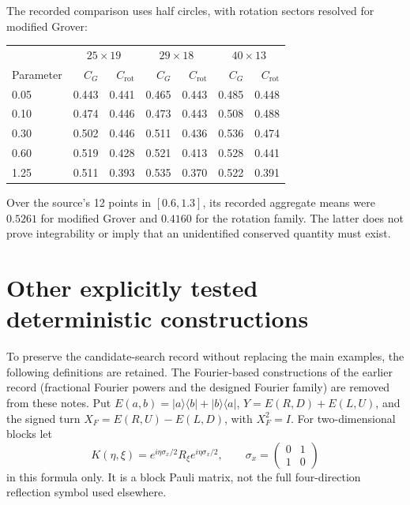 \documentclass[11pt,a4paper,oneside]{report}
\newcommand{\ket}[1]{\lvert #1\rangle}
\newcommand{\bra}[1]{\langle #1\rvert}
\newcommand{\Id}{I}
\numberwithin{equation}{chapter}
\begin{document}
The recorded comparison uses half circles, with rotation sectors
resolved for modified Grover:
\begin{center}
\small
\begin{tabular}{@{}lrrrrrr@{}}
\toprule
&\multicolumn{2}{c}{\(25\times19\)}&\multicolumn{2}{c}{\(29\times18\)}
&\multicolumn{2}{c}{\(40\times13\)}\\
Parameter&\(C_G\)&\(C_{\mathrm{rot}}\)&\(C_G\)&\(C_{\mathrm{rot}}\)
&\(C_G\)&\(C_{\mathrm{rot}}\)\\
\midrule
0.05&0.443&0.441&0.465&0.443&0.485&0.448\\
0.10&0.474&0.446&0.473&0.443&0.508&0.488\\
0.30&0.502&0.446&0.511&0.436&0.536&0.474\\
0.60&0.519&0.428&0.521&0.413&0.528&0.441\\
1.25&0.511&0.393&0.535&0.370&0.522&0.391\\
\bottomrule
\end{tabular}
\end{center}
Over the source's 12 points in \([0.6,1.3]\), its recorded aggregate
means were \(0.5261\) for modified Grover and \(0.4160\) for the
rotation family. The latter does not prove integrability or imply
that an unidentified conserved quantity must exist.

\section{Other explicitly tested deterministic constructions}

To preserve the candidate-search record without replacing the main
examples, the following definitions are retained. The Fourier-based
constructions of the earlier record (fractional Fourier powers and the
designed Fourier family) are removed from these notes. Put
\(E(a,b)=\ket a\bra b+\ket b\bra a\),
\(Y=E(R,D)+E(L,U)\), and the signed turn
\(X_F=E(R,U)-E(L,D)\), with \(X_F^2=\Id\).
For two-dimensional blocks let
\begin{equation}
K(\eta,\xi)=e^{i\eta\sigma_x/2}R_\xi e^{i\eta\sigma_x/2},
\qquad \sigma_x=\begin{pmatrix}0&1\\1&0\end{pmatrix}
\end{equation}
in this formula only. It is a block Pauli matrix, not the full
four-direction reflection symbol used elsewhere.
\end{document}
